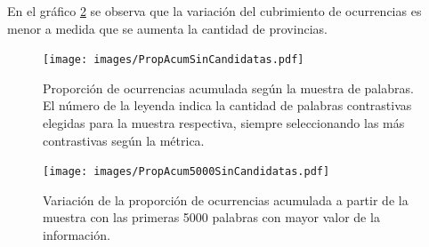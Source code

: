 En el gráfico \ref{fig:propAcum5000} se observa que la variación del cubrimiento de ocurrencias es menor a medida que se aumenta la cantidad de provincias. 


\begin{figure}\centering
    \texttt{[image: images/PropAcumSinCandidatas.pdf]}
    \caption{Proporción de ocurrencias acumulada según la muestra de palabras. El número de la leyenda indica la cantidad de palabras contrastivas elegidas para la muestra respectiva, siempre seleccionando las más contrastivas según la métrica.} 
    \label{fig:propAcum} 
\end{figure}


\begin{figure}[ht]\centering
    \texttt{[image: images/PropAcum5000SinCandidatas.pdf]}
    \caption{Variación de la proporción de ocurrencias acumulada a partir de la muestra con las primeras 5000 palabras con mayor valor de la información.} 
    \label{fig:propAcum5000} 
\end{figure}


